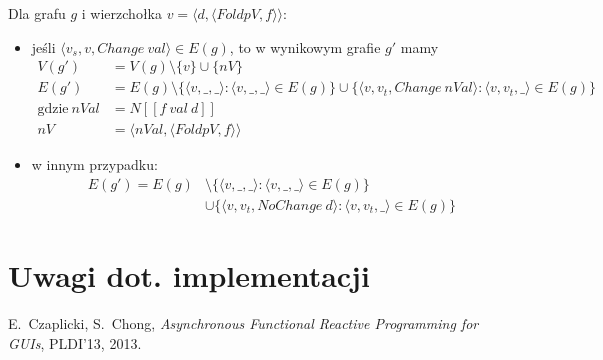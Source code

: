 \documentclass[11pt,leqno]{article}
\begin{document}
Dla grafu $g$ i wierzchołka $v = \langle d, \langle FoldpV,f \rangle \rangle$:
\begin{itemize}
\item jeśli $ \langle v_s , v, Change\:val \rangle \in E(g) $, to w wynikowym grafie $g'$ mamy
\begin {align*}
V(g') &= V(g) \setminus \{ v \} \cup \{ nV \} \\
E(g') &= E(g) \setminus \{ \langle v, \_, \_ \rangle : \langle v, \_ , \_ \rangle \in E(g) \} \cup \{ \langle v, v_t, Change\: nVal \rangle : \langle v, v_t , \_ \rangle \in E(g) \} \\
\text{gdzie} \: nVal &= N [\![f \: val \: d]\!] \\
nV &= \langle nVal , \langle FoldpV,f \rangle \rangle
\end{align*}
\item w innym przypadku:
\begin{align*}
E(g') = E(g) &\setminus \{ \langle v, \_, \_ \rangle : \langle v, \_ , \_ \rangle \in E(g) \} \\ 
&\cup \{ \langle v, v_t, NoChange\: d \rangle : \langle v, v_t , \_ \rangle \in E(g) \}
\end{align*}
\end{itemize}

\section{Uwagi dot. implementacji}

\thispagestyle{empty}
\begin{thebibliography}{99}

   E.~Czaplicki, S.~Chong, \textit{Asynchronous Functional Reactive Programming for GUIs},
              PLDI’13, 2013.
	  
\end{thebibliography}
\end{document}
